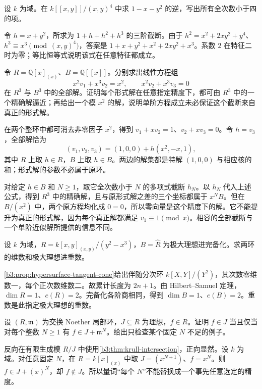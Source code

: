 \begin{exercise}\label{b3:ex:13-finite-inverse}
	设 \(k\) 为域。在 \(k[\![x,y]\!]/(x,y)^4\) 中求 \(1-x-y^2\) 的逆，写出所有全次数小于四的项。
\end{exercise}
\begin{solution}
	令 \(h=x+y^2\)，所求为 \(1+h+h^2+h^3\) 的三阶截断。由于 \(h^2=x^2+2xy^2+y^4\)、\(h^3\equiv x^3\pmod{(x,y)^4}\)，答案是 \(1+x+y^2+x^2+2xy^2+x^3\)。系数 \(2\) 在特征二时为零；等比恒等式说明该式在任意特征都成立。
\end{solution}

\begin{exercise}\label{b3:ex:13-linear-equations-descend}
	令 \(R=\mathbb Q[x]_{(x)}\)、\(B=\mathbb Q[\![x]\!]\)。分别求出线性方程组
	\[
		x^2v_1+x^3v_2=x^2,\qquad x^2v_2+x^3v_3=0
	\]
	在 \(R^3\) 与 \(B^3\) 中的全部解。证明每个形式解在任意指定精度下，都可由 \(R^3\) 中的一个精确解逼近；再给出一个模 \(x^2\) 的解，说明单阶方程成立未必保证这个截断来自真正的形式解。
\end{exercise}
\begin{solution}
	在两个整环中都可消去非零因子 \(x^2\)，得到 \(v_1+xv_2=1\)、\(v_2+xv_3=0\)。令 \(h=v_3\)，全部解恰为
	\[
		(v_1,v_2,v_3)=(1,0,0)+h(x^2,-x,1),
	\]
	其中 \(R\) 上取 \(h\in R\)，\(B\) 上取 \(h\in B\)。两边的解集都是特解 \((1,0,0)\) 与相应核的和；形式解的参数不必属于原环。

	对给定 \(h\in B\) 和 \(N\ge1\)，取它全次数小于 \(N\) 的多项式截断 \(h_N\)。以 \(h_N\) 代入上述公式，得到 \(R^3\) 中的精确解，且与原形式解之差的三个坐标都属于 \(x^NB\)。但在 \(B/(x^2)\) 中，两个原方程均化成 \(0=0\)，所以零向量是这个精度下的解。它不能提升为真正的形式解，因为每个真正解都满足 \(v_1\equiv1\pmod x\)。相容的全部截断与一个单阶近似解所提供的信息不同。
\end{solution}

\begin{exercise}\label{b3:ex:13-cusp-multiplicity}
	设 \(k\) 为域，\(R=k[x,y]_{(x,y)}/(y^2-x^3)\)，\(B=\widehat R\) 为极大理想进完备化。求两环的维数和极大理想进重数。
\end{exercise}
\begin{solution}
	\cref{b3:prop:hypersurface-tangent-cone}给出伴随分次环 \(k[X,Y]/(Y^2)\)，其次数零维数一，每个正次数维数二。故累计长度为 \(2n+1\)。由 Hilbert–Samuel 定理，\(\dim R=1\)、\(e(R)=2\)。完备化各阶商相同，得到 \(\dim B=1\)、\(e(B)=2\)。重数是此指定极大理想的重数。
\end{solution}

\begin{exercise}\label{b3:ex:13-approximate-membership}
	设 \((R,\mathfrak m)\) 为交换 Noether 局部环，\(J\subseteq R\) 为理想，\(f\in R\)。证明 \(f\in J\) 当且仅当对每个整数 \(N\ge1\) 有 \(f\in J+\mathfrak m^N\)。给出只检查某个固定 \(N\) 不足的例子。
\end{exercise}
\begin{solution}
	反向在有限生成模 \(R/J\) 中使用\cref{b3:thm:krull-intersection}，正向显然。设 \(k\) 为域。对任意固定 \(N\)，在 \(R=k[x]_{(x)}\) 中取 \(J=(x^{N+1})\)、\(f=x^N\)。则 \(f\in J+(x)^N\)，却 \(f\notin J\)。所以量词“每个 \(N\)”不能替换成一个事先任意选定的精度。
\end{solution}

